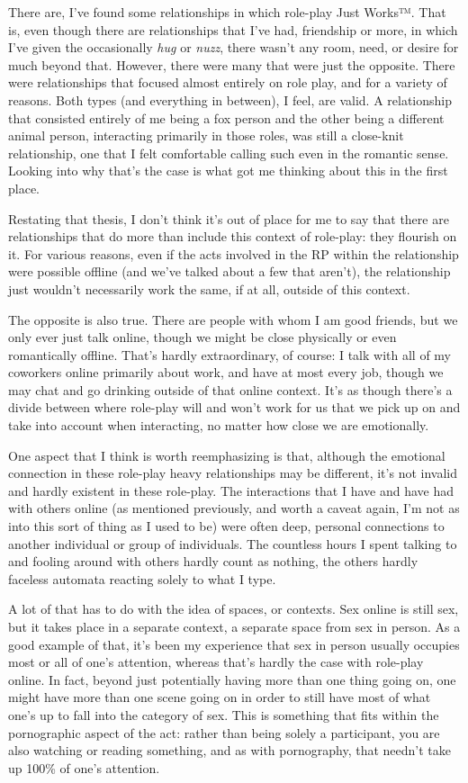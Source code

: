 There are, I've found some relationships in which role-play Just Works™. That is, even though there are relationships that I've had, friendship or more, in which I've given the occasionally \emph{hug} or \emph{nuzz}, there wasn't any room, need, or desire for much beyond that. However, there were many that were just the opposite. There were relationships that focused almost entirely on role play, and for a variety of reasons. Both types (and everything in between), I feel, are valid. A relationship that consisted entirely of me being a fox person and the other being a different animal person, interacting primarily in those roles, was still a close-knit relationship, one that I felt comfortable calling such even in the romantic sense. Looking into why that's the case is what got me thinking about this in the first place.

Restating that thesis, I don't think it's out of place for me to say that there are relationships that do more than include this context of role-play: they flourish on it. For various reasons, even if the acts involved in the RP within the relationship were possible offline (and we've talked about a few that aren't), the relationship just wouldn't necessarily work the same, if at all, outside of this context.

The opposite is also true. There are people with whom I am good friends, but we only ever just talk online, though we might be close physically or even romantically offline. That's hardly extraordinary, of course: I talk with all of my coworkers online primarily about work, and have at most every job, though we may chat and go drinking outside of that online context. It's as though there's a divide between where role-play will and won't work for us that we pick up on and take into account when interacting, no matter how close we are emotionally.

One aspect that I think is worth reemphasizing is that, although the emotional connection in these role-play heavy relationships may be different, it's not invalid and hardly existent in these role-play. The interactions that I have and have had with others online (as mentioned previously, and worth a caveat again, I'm not as into this sort of thing as I used to be) were often deep, personal connections to another individual or group of individuals. The countless hours I spent talking to and fooling around with others hardly count as nothing, the others hardly faceless automata reacting solely to what I type.

A lot of that has to do with the idea of spaces, or contexts. Sex online is still sex, but it takes place in a separate context, a separate space from sex in person. As a good example of that, it's been my experience that sex in person usually occupies most or all of one's attention, whereas that's hardly the case with role-play online. In fact, beyond just potentially having more than one thing going on, one might have more than one scene going on in order to still have most of what one's up to fall into the category of sex. This is something that fits within the pornographic aspect of the act: rather than being solely a participant, you are also watching or reading something, and as with pornography, that needn't take up 100\% of one's attention.

